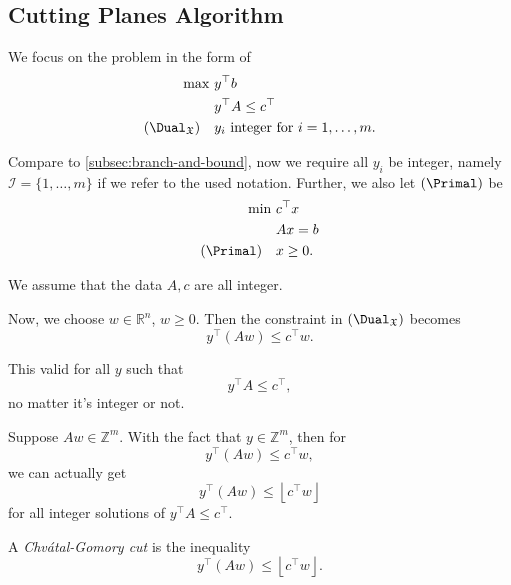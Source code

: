 \subsection{Cutting Planes Algorithm}
We focus on the problem in the form of
\[
	\begin{aligned}
		\max~                        & y^{\top}b                                  \\
		                             & y^{\top}A\leq c^{\top}                     \\
		(\Dual_{\mathfrak{X} })\quad & y_{i}\text{ integer for }i = 1, \dots , m.
	\end{aligned}
\]
\begin{note}
	Compare to \autoref{subsec:branch-and-bound}, now we require all \(y_{i}\) be integer, namely \(\mathcal{I} = \{1, \dots , m\}\) if we refer to the used notation. Further, we also let \((\Primal)\) be
	\[
		\begin{aligned}
			\min~          & c^{\top}x \\
			               & Ax = b    \\
			(\Primal)\quad & x\geq 0.
		\end{aligned}
	\]
\end{note}

\begin{remark}
	We assume that the data \(A, c\) are all integer.
\end{remark}

Now, we choose \(w\in \mathbb{R}^n\), \(w\geq 0\). Then the constraint in \((\Dual_{\mathfrak{X}})\) becomes
\[
	y^{\top}(Aw) \leq c^{\top}w.
\]

\begin{remark}
	This valid for all \(y\) such that
	\[
		y^{\top}A\leq c^{\top},
	\]
	no matter it's integer or not.
\end{remark}

Suppose \(Aw\in\mathbb{Z}^m\). With the fact that \(y\in \mathbb{Z}^m\), then for
\[
	y^{\top}(Aw)\leq c^{\top}w,
\]
we can actually get
\[
	y^{\top}(Aw)\leq \left\lfloor c^{\top}w \right\rfloor
\]
for all integer solutions of \(y^{\top} A \leq c^{\top} \).

\begin{definition}\label{def:Chvatal-Gomory-cut}
	A \emph{Chvátal-Gomory cut} is the inequality
	\[
		y^{\top}(Aw)\leq \left\lfloor c^{\top}w \right\rfloor.
	\]
\end{definition}

